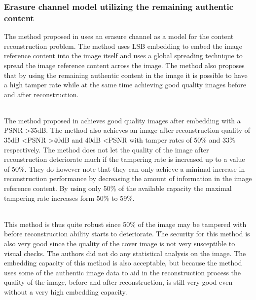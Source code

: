 \documentclass[12pt]{article}
\begin{document}
\subsubsection{Erasure channel model utilizing the remaining authentic content}
\label{ErasureChannelOverview}
The method proposed in \cite {korus2013efficient} uses an erasure channel as a model for the content reconstruction problem.
The method uses LSB embedding to embed the image reference content into the image itself and uses a global spreading technique to spread the image reference content across the image.
The method also proposes that by using the remaining authentic content in the image it is possible to have a high tamper rate while at the same time achieving good quality images before and after reconstruction.

\hspace{0pt} \\
The method proposed in \cite {korus2013efficient} achieves good quality images after embedding with a PSNR \textgreater 35dB. 
The method also achieves an image after reconstruction quality of 35dB \textless PSNR \textgreater 40dB and 40dB \textless PSNR with tamper rates of 50\% and 33\% respectively.
The method does not let the quality of the image after reconstruction deteriorate much if the tampering rate is increased up to a value of 50\%.
They do however note that they can only achieve a minimal increase in reconstruction performance by decreasing the amount of information in the image reference content.
By using only 50\% of the available capacity the maximal tampering rate increases form 50\% to 59\%.

\hspace{0pt} \\
This method \cite {korus2013efficient} is thus quite robust since 50\% of the image may be tampered with before reconstruction ability starts to deteriorate.
The security for this method is also very good since the quality of the cover image is not very susceptible to visual checks.
The authors did not do any statistical analysis on the image.
The embedding capacity of this method is also acceptable, but because the method uses some of the authentic image data to aid in the reconstruction process the quality of the image, before and after reconstruction, is still very good even without a very high embedding capacity.  
\end{document}
